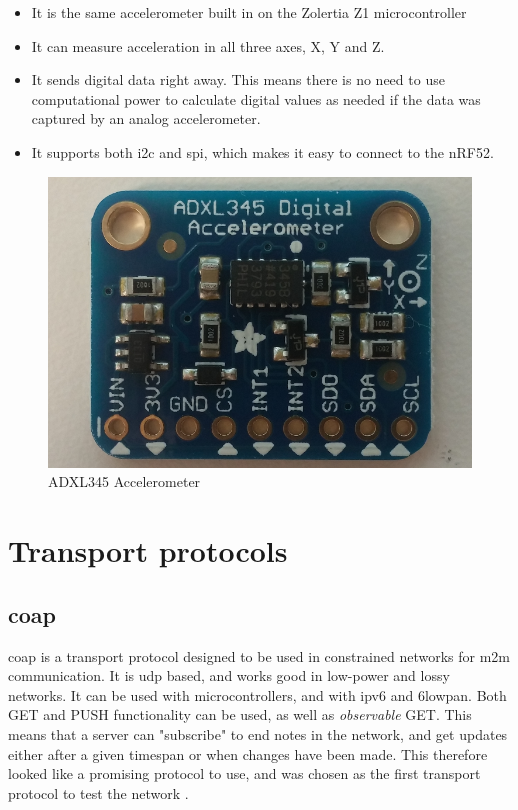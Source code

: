 \begin{itemize}
  \item It is the same accelerometer built in on the Zolertia Z1 microcontroller
  \item It can measure acceleration in all three axes, X, Y and Z.
  \item It sends digital data right away. This means there is no need to use computational power to calculate digital values as needed if the data was captured by an analog accelerometer. 
  \item It supports both \gls{i2c} and \gls{spi}, which makes it easy to connect to the nRF52. 
\end{itemize}


\begin{figure}[h]
    \centering
    \includegraphics[scale=0.32]{ADXL345.png}    \caption{ADXL345 Accelerometer}
    \label{fig:adxl345}
\end{figure}

\newpage

\section{Transport protocols}

\subsection{\gls{coap}}


\gls{coap} is a transport protocol designed to be used in constrained networks for \gls{m2m} communication. It is \gls{udp} based, and works good in low-power and lossy networks. It can be used with microcontrollers, and with \gls{ipv6} and \gls{6lowpan}. Both GET and PUSH functionality can be used, as well as \textit{observable} GET. This means that a server can "subscribe" to end notes in the network, and get updates either after a given timespan or when changes have been made. This therefore looked like a promising protocol to use, and was chosen as the first transport protocol to test the network \cite{shelby2014constrained}.
   



